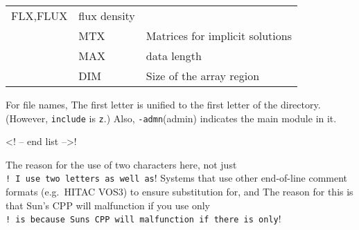 \begin{longtable}[]{@{}lll@{}}
\begin{minipage}[t]{0.30\columnwidth}
FLX,FLUX\strut
\end{minipage} & \begin{minipage}[t]{0.30\columnwidth}\raggedright
flux density\strut
\end{minipage}\tabularnewline
\begin{minipage}[t]{0.30\columnwidth}\raggedright
\strut
\end{minipage} & \begin{minipage}[t]{0.30\columnwidth}\raggedright
MTX\strut
\end{minipage} & \begin{minipage}[t]{0.30\columnwidth}\raggedright
Matrices for implicit solutions\strut
\end{minipage}\tabularnewline
\begin{minipage}[t]{0.30\columnwidth}\raggedright
\strut
\end{minipage} & \begin{minipage}[t]{0.30\columnwidth}\raggedright
MAX\strut
\end{minipage} & \begin{minipage}[t]{0.30\columnwidth}\raggedright
data length\strut
\end{minipage}\tabularnewline
\begin{minipage}[t]{0.30\columnwidth}\raggedright
\strut
\end{minipage} & \begin{minipage}[t]{0.30\columnwidth}\raggedright
DIM\strut
\end{minipage} & \begin{minipage}[t]{0.30\columnwidth}\raggedright
Size of the array region\strut
\end{minipage}\tabularnewline
\bottomrule
\end{longtable}

For file names, The first letter is unified to the first letter of the
directory. (However, {\texttt{include}} is {\texttt{z}}.) Also,
{\texttt{-admn}}(admin) indicates the main module in it.

\textless! -- end list --\textgreater!

The reason for the use of two characters here, not just
\texttt{!\ I\ use\ two\ letters\ as\ well\ as}! Systems that use other
end-of-line comment formats (e.g.~HITAC VOS3) to ensure substitution
for, and The reason for this is that Sun's CPP will malfunction if you
use only
\texttt{!\ is\ because\ Sun\textquotesingle{}s\ CPP\ will\ malfunction\ if\ there\ is\ only}!
